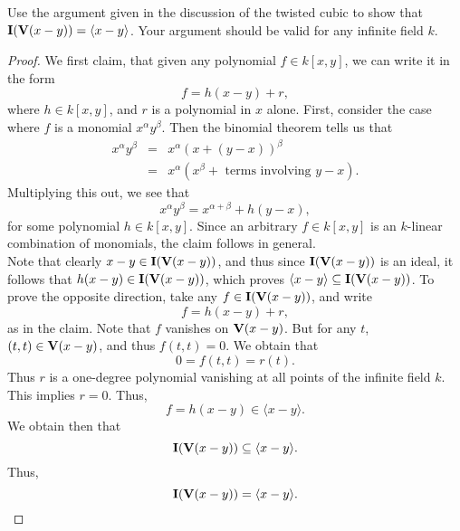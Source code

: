 \begin{exercise}{10}
Use the argument given in the discussion of the twisted cubic to show that $\mathbf{I}(\mathbf{V}(x-y)) = \langle x-y\rangle$. Your argument should be valid for any infinite field $k$.    
\end{exercise}
\begin{proof}
    We first claim, that given any polynomial $f\in k[x,y]$, we can write it in the form
    $$f = h(x-y) + r,$$
    where $h\in k[x,y]$, and $r$ is a polynomial in $x$ alone. First, consider the case where $f$ is a monomial $x^\alpha y^\beta$. Then the binomial theorem tells us that
    \begin{eqnarray*}
        x^\alpha y^\beta 
        & = & x^\alpha (x + (y-x))^\beta\\
        & = & x^\alpha (x^\beta + \text{ terms involving } y-x).
    \end{eqnarray*}
    Multiplying this out, we see that
    $$x^\alpha y^\beta = x^{\alpha+\beta} + h(y-x),$$
    for some polynomial $h\in k[x,y]$. Since an arbitrary $f\in k[x,y]$ is an $k$-linear combination of monomials, the claim follows in general.\\
    Note that clearly $x-y\in \mathbf{I}(\mathbf{V}(x-y))$, and thus since $\mathbf{I}(\mathbf{V}(x-y))$ is an ideal, it follows that $h(x-y)\in \mathbf{I}(\mathbf{V}(x-y))$, which proves $\langle x-y\rangle \subseteq \mathbf{I}(\mathbf{V}(x-y))$. To prove the opposite direction, take any $f\in \mathbf{I}(\mathbf{V}(x-y))$, and write
    $$f = h(x-y) + r,$$
    as in the claim. Note that $f$ vanishes on $\mathbf{V}(x-y)$. But for any $t$, $(t,t)\in \mathbf{V}(x-y)$, and thus $f(t,t) = 0$. We obtain that
    $$0 = f(t,t) = r(t).$$
    Thus $r$ is a one-degree polynomial vanishing at all points of the infinite field $k$. This implies $r= 0$. Thus,
    $$f = h(x-y) \in \langle x-y\rangle.$$
    We obtain then that
    $$\mathbf{I}(\mathbf{V}(x-y))\subseteq \langle x-y\rangle.$$
    Thus,
    $$\mathbf{I}(\mathbf{V}(x-y)) = \langle x-y\rangle.$$
\end{proof}

